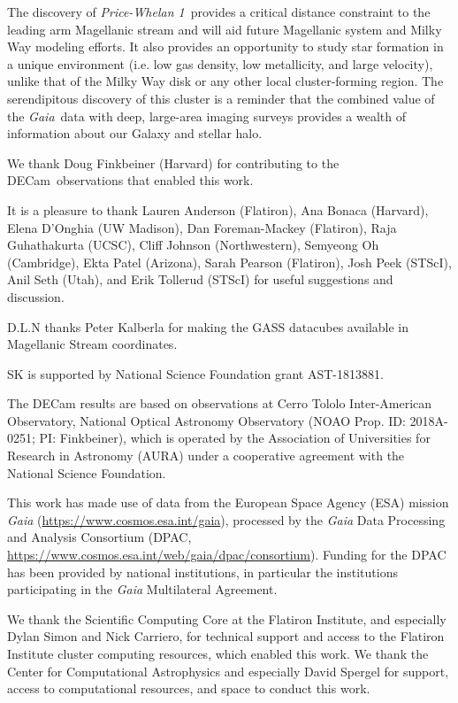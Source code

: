 \documentclass[twocolumn]{aastex62}
\newcommand{\gaia}{\textsl{Gaia}}
\newcommand{\decam}{DECam}
\newcommand{\clustername}{\textsl{Price-Whelan 1}}
\begin{document}
The discovery of \clustername\ provides a critical distance constraint to the leading arm Magellanic stream and will aid future Magellanic system and Milky Way modeling efforts.
It also provides an opportunity to study star formation in a unique environment (i.e. low gas density, low metallicity, and large velocity), unlike that of the Milky Way disk or any other local cluster-forming region.
The serendipitous discovery of this cluster is a reminder that the combined value of the \gaia\ data with deep, large-area imaging surveys provides a wealth of information about our Galaxy and stellar halo.


\acknowledgments

We thank Doug Finkbeiner (Harvard) for contributing to the \decam\ observations that enabled this work.

It is a pleasure to thank
Lauren Anderson (Flatiron),
Ana Bonaca (Harvard),
Elena D'Onghia (UW Madison),
Dan Foreman-Mackey (Flatiron),
Raja Guhathakurta (UCSC),
Cliff Johnson (Northwestern),
Semyeong Oh (Cambridge),
Ekta Patel (Arizona),
Sarah Pearson (Flatiron),
Josh Peek (STScI),
Anil Seth (Utah),
and Erik Tollerud (STScI)
for useful suggestions and discussion.

D.L.N thanks Peter Kalberla for making the GASS datacubes available in Magellanic Stream coordinates.

SK is supported by National Science Foundation grant AST-1813881.

The DECam results are based on observations at Cerro Tololo Inter-American Observatory, National Optical Astronomy Observatory (NOAO Prop. ID: 2018A-0251; PI: Finkbeiner), which is operated by the Association of Universities for Research in Astronomy (AURA) under a cooperative agreement with the National Science Foundation.

This work has made use of data from the European Space Agency (ESA)
mission {\it Gaia} (\url{https://www.cosmos.esa.int/gaia}), processed by
the {\it Gaia} Data Processing and Analysis Consortium (DPAC,
\url{https://www.cosmos.esa.int/web/gaia/dpac/consortium}). Funding
for the DPAC has been provided by national institutions, in particular
the institutions participating in the {\it Gaia} Multilateral Agreement.

We thank the Scientific Computing Core at the Flatiron Institute, and especially Dylan Simon and Nick Carriero, for technical support and access to the Flatiron Institute cluster computing resources, which enabled this work.
We thank the Center for Computational Astrophysics and especially David Spergel for support, access to computational resources, and space to conduct this work.
\end{document}
